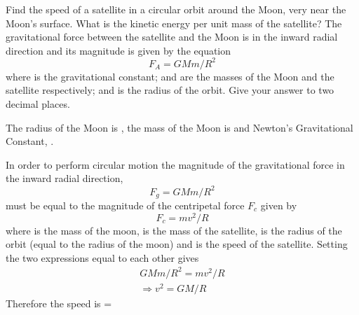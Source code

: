 \begin{problem}
{Find the speed of a satellite in a circular orbit around the Moon, very near the Moon's surface. What is the kinetic energy per unit mass of the satellite?
The gravitational force  between the satellite and the Moon is in the inward radial direction and its magnitude is given by the equation 
\begin{equation*}
F_A=GMm/R^2
\end{equation*}
where  is the gravitational constant;  and  are the masses of the Moon and the satellite respectively; and  is the radius of the orbit. Give your answer to two decimal places.

 The radius of the Moon is , the mass of the Moon is  and Newton's Gravitational Constant, .} 
{}
{In order to perform circular motion the magnitude of the gravitational force  in the inward radial direction, 
\begin{equation*} F_g=GMm/R^2 \end{equation*}
must be equal to the magnitude of the centripetal force $F_c$ given by 
\begin{equation*} F_c=mv^2/R \end{equation*}
where  is the mass of the moon,  is the mass of the satellite,  is the radius of the orbit (equal to the radius of the moon) and  is the speed of the satellite. Setting the two expressions equal to each other gives
\begin{align*} GMm/R^2=mv^2/R \\ \Rightarrow v^2=GM/R \end{align*}
Therefore the speed is  = 
}
\end{problem}